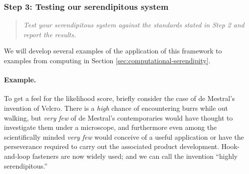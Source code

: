 \subsubsection*{Step 3: Testing our serendipitous system}

\begin{quote} {\em Test your serendipitous system against the standards stated in Step 2 and report the
results.}\end{quote}

\noindent We will develop several examples of the application of this framework
to examples from computing in Section
\ref{sec:computational-serendipity}.  

\paragraph{Example.}
To get a feel for the likelihood score, briefly consider the case of
de Mestral's invention of Velcro\texttrademark.  There is a
\emph{high} chance of encountering burrs while out walking, but
\emph{very few} of de Mestral's contemporaries would have thought to
investigate them under a microscope, and furthermore even among the
scientifically minded \emph{very few} would conceive of a useful
application or have the perseverance required to carry out the
associated product development.  Hook-and-loop fasteners are now
widely used; and we can call the invention ``highly serendipitous.''

